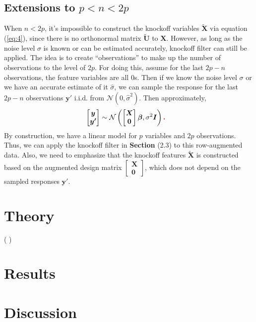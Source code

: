 \documentclass{uwstat572}
\newcommand{\vmadd}[1]{\textbf{\color{red}{#1}}}
\newcommand{\vmcomment}[1]{({\color{blue}{VM's comment:}} \textbf{\color{blue}{#1}})}
\begin{document}
\subsection{Extensions to $p<n<2p$}
When $n< 2p$, it's impossible to construct the knockoff variables $\tilde{\bm{X}}$ via equation (\ref{eq:4}), since there is no orthonormal matrix $\tilde{\bm{U}}$ to $\bm{X}$. 
However, as long as the noise level $\sigma$ is known or can be estimated accurately, knockoff filter can still be applied. 
The idea is to create ``observations'' to make up the number of observations to the level of $2p$. For doing this, assume for the last $2p-n$ observations, the feature variables are all $0$s. Then if we know the noise level $\sigma$ or we have an accurate estimate of it $\hat\sigma$, we can sample the response for the last $2p-n$ observations $\bm{y}'$ i.i.d. from $\mathcal{N}(0, \hat{\sigma}^2)$. Then approximately, 
\begin{align*}
& \begin{bmatrix}\bm{y} \\ \bm{y'}\end{bmatrix} \sim 
\mathcal{N}\left(\begin{bmatrix}\bm{X} \\ \bm{0}\end{bmatrix}\bm{\beta}, \sigma^2 \bm{I} \right)\vmadd{.}
\end{align*}
By construction, we have a linear model for $p$ variables and $2p$ observations. Thus, we can apply the knockoff filter in \textbf{Section }(2.3) to this row-augmented data. Also, we need to emphasize that the knockoff features $\tilde{\bm{X}}$ is constructed based on the augmented design matrix $\begin{bmatrix}\bm{X} \\ \bm{0}\end{bmatrix}$, which does not depend on the sampled responses $\bm{y'}$.
\section{Theory}
\vmcomment{I wouldn't separate Theory from Methods. If you want to prove something, do it as needed in the Methods section.}

\section{Results}

\section{Discussion}


\end{document}
